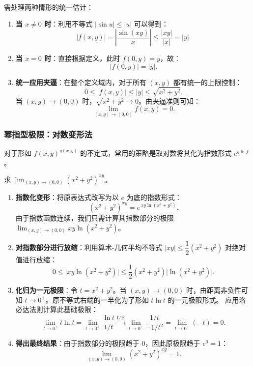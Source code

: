 \documentclass[lang=cn,11pt]{elegantbook}
\begin{document}
\begin{solution}
需处理两种情形的统一估计：
\begin{enumerate}
  \item \textbf{当 $x \neq 0$ 时}：利用不等式 $|\sin u|\leq|u|$ 可以得到：
  \[
  |f(x,y)| = \left|\frac{\sin(xy)}{x}\right| \leqslant  \frac{|xy|}{|x|} = |y|.
  \]
  \item \textbf{当 $x=0$ 时}：直接根据定义，此时 $f(0,y)=y$，故：
  \[
  |f(0,y)| = |y|.
  \]
  \item \textbf{统一应用夹逼}：在整个定义域内，对于所有 $(x,y)$ 都有统一的上限控制：
  \[
  0 \leqslant  |f(x,y)|\leq|y|\leq\sqrt{x^2+y^2}.
  \]
  当 $(x,y)\to(0,0)$ 时，$\sqrt{x^2+y^2}\to 0$。由夹逼准则可知：
  \[
  \boxed{\lim_{(x,y)\to(0,0)}f(x,y)=0}.
  \]
\end{enumerate}
\end{solution}


\subsubsection{幂指型极限：对数变形法}

对于形如 $f(x,y)^{g(x,y)}$ 的不定式，常用的策略是取对数将其化为指数形式 $e^{g \ln f}$。

\begin{exercise}[幂指型极限] \label{ex:limit-power-exp}
求 $\displaystyle\lim_{(x,y)\to(0,0)}(x^2+y^2)^{xy}$。
\end{exercise}

\begin{solution}
\begin{enumerate}
  \item \textbf{指数化变形}：将原表达式改写为以 $e$ 为底的指数形式：
  \[
  (x^2+y^2)^{xy}=e^{\,xy\ln(x^2+y^2)}.
  \]
  由于指数函数连续，我们只需计算其指数部分的极限 $\displaystyle\lim_{(x,y)\to(0,0)}xy\ln(x^2+y^2)$。

  \item \textbf{对指数部分进行放缩}：利用算术-几何平均不等式 $|xy|\leq\dfrac12(x^2+y^2)$ 对绝对值进行放缩：
  \[
  0\leq\bigl|xy\ln(x^2+y^2)\bigr| \leq\frac12(x^2+y^2)\bigl|\ln(x^2+y^2)\bigr|.
  \]

  \item \textbf{化归为一元极限}：令 $t=x^2+y^2$。当 $(x,y)\to(0,0)$ 时，由距离非负性可知 $t\to 0^+$。原不等式右端的一半化为了形如 $t \ln t$ 的一元极限形式。
  应用洛必达法则计算此基础极限：
  \[
  \lim_{t\to 0^+}t\ln t = \lim_{t\to 0^+}\frac{\ln t}{1/t} \xrightarrow{\text{L'H}} \lim_{t\to 0^+}\frac{1/t}{-1/t^2} = \lim_{t\to 0^+}(-t) = 0.
  \]

  \item \textbf{得出最终结果}：由于指数部分的极限趋于 $0$，因此原极限趋于 $e^0=1$：
  \[
  \boxed{\lim_{(x,y)\to(0,0)}(x^2+y^2)^{xy}=1}.
  \]
\end{enumerate}
\end{solution}
\end{document}
